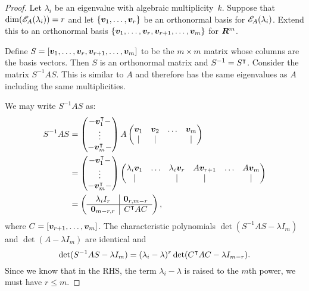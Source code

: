 \begin{proof}
Let $\lambda_i$ be an eigenvalue with algebraic multiplicity~$k$.  Suppose that
$\dim(\mathscr{E}_{A}(\lambda_i)) = r$ and let $\{\boldsymbol{v}_1, \ldots, \boldsymbol{v}_r\}$ be an
orthonormal basis for $\mathscr{E}_{A}(\lambda_i)$.  Extend this to an
orthonormal basis $\{\boldsymbol{v}_1, \ldots, \boldsymbol{v}_r, \boldsymbol{v}_{r + 1}, \ldots, \boldsymbol{v}_m\}$ 
for $\bm{R}^m$. 

Define $S = [\boldsymbol{v}_1, \ldots, \boldsymbol{v}_r, \boldsymbol{v}_{r + 1}, \ldots, \boldsymbol{v}_m]$ 
to be the $m \times m$ matrix whose columns are the basis vectors. 
Then $S$ is an orthonormal matrix and $S^{-1} = S^{\intercal}$. Consider the 
matrix $S^{-1} A S$. This is similar to $A$ and therefore has the 
same eigenvalues as $A$ including the same multiplicities. 

We may write $S^{-1} A S$ as:
\begin{align*}
    S^{-1} A S & = \begin{pmatrix} 
                        -\boldsymbol{v}_1^{\intercal}- \\
                         \vdots \\
                        -\boldsymbol{v}_m^{\intercal}- 
                   \end{pmatrix} 
                   A 
                   \begin{pmatrix}
                    \boldsymbol{v}_1 & \boldsymbol{v}_2 & \ldots & \boldsymbol{v}_m \\
                        |      &    |       &        &    |       
                   \end{pmatrix} \\
              & = \begin{pmatrix} 
                        -\boldsymbol{v}_1^{\intercal}- \\
                         \vdots \\
                        -\boldsymbol{v}_m^{\intercal}- 
                   \end{pmatrix} 
                   \begin{pmatrix}
                    \lambda_i \boldsymbol{v}_1 & \ldots & \lambda_i \boldsymbol{v}_r & A \boldsymbol{v}_{r + 1} & \ldots & A \boldsymbol{v}_m \\
                            |          &        &         |          &          |         &        &     |
                   \end{pmatrix} \\
             & = \left ( \begin{array}{c|c}
                    \lambda_i I_r         & \boldsymbol{0}_{r, m - r} \\ \hline
                    \boldsymbol{0}_{m - r, r} & C^{\intercal} A C 
                 \end{array} \right ),
\end{align*}
where $C = [\boldsymbol{v}_{r + 1}, \ldots, \boldsymbol{v}_m]$. The characteristic polynomials 
$\det (S^{-1} A S - \lambda I_m)$ and $\det (A - \lambda I_m)$ are identical 
and 
\[
   \det (S^{-1} A S - \lambda I_m) = (\lambda_i - \lambda)^r \det (C^{\intercal} A C - \lambda I_{m - r}). 
\]
Since we know that in the RHS, the term $\lambda_i - \lambda$ is raised to the $m$th power, 
we must have $r \leq m$. 
\end{proof}

